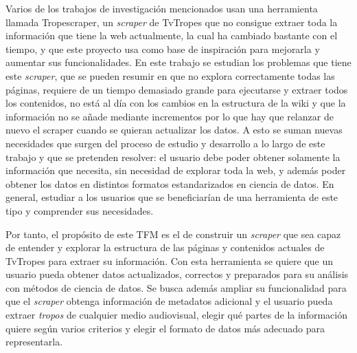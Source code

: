 Varios de los trabajos de investigación mencionados usan una herramienta llamada
Tropescraper, un \textit{scraper} de TvTropes que no consigue extraer toda la
información que tiene la web actualmente, la cual ha cambiado bastante con el
tiempo, y que este proyecto usa como base de inspiración para mejorarla y
aumentar sus funcionalidades. En este trabajo se estudian los problemas que
tiene este \textit{scraper}, que se pueden resumir en que no explora
correctamente todas las páginas, requiere de un tiempo demasiado grande para
ejecutarse y extraer todos los contenidos, no está al día con los cambios en la
estructura de la wiki y que la información no se añade mediante incrementos por
lo que hay que relanzar de nuevo el scraper cuando se quieran actualizar los
datos. A esto se suman nuevas necesidades que surgen del proceso de estudio y
desarrollo a lo largo de este trabajo y que se pretenden resolver: el usuario
debe poder obtener solamente la información que necesita, sin necesidad de
explorar toda la web, y además poder obtener los datos en distintos formatos
estandarizados en ciencia de datos. En general, estudiar a los usuarios que se
beneficiarían de una herramienta de este tipo y comprender sus necesidades.

Por tanto, el propósito de este TFM es el de construir un \textit{scraper} que
sea capaz de entender y explorar la estructura de las páginas y contenidos
actuales de TvTropes para extraer su información. Con esta herramienta se quiere
que un usuario pueda obtener datos actualizados, correctos y preparados para su
análisis con métodos de ciencia de datos. Se busca además ampliar su
funcionalidad para que el \textit{scraper} obtenga información de metadatos
adicional y el usuario pueda extraer \textit{tropos} de cualquier medio
audiovisual, elegir qué partes de la información quiere según varios criterios y
elegir el formato de datos más adecuado para representarla.

